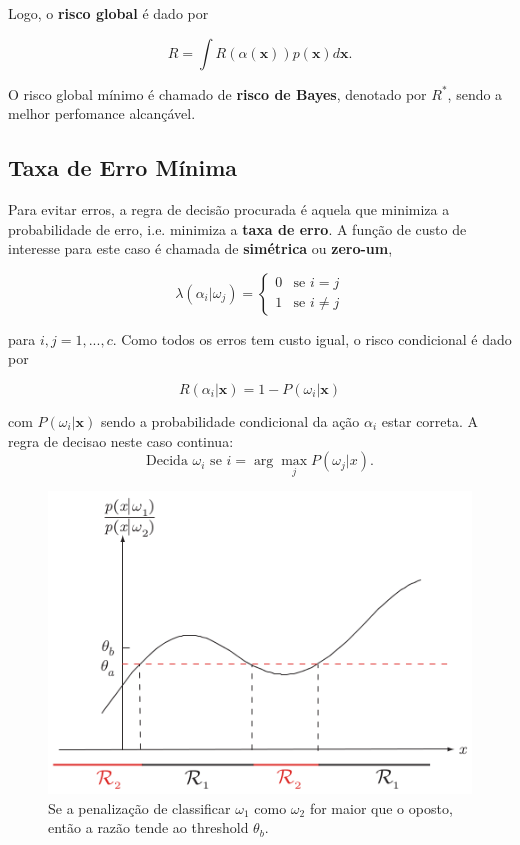 \documentclass[a4paper,12pt,twocolumn]{article}
\newcommand{\twopartdef}[4]
{
    \left\{
        \begin{array}{ll}
            #1 & \mbox{se } #2 \\
            #3 & \mbox{se } #4
        \end{array}
    \right.
}
\begin{document}
\noindent Logo, o \textbf{risco global} é dado por

\begin{equation}
    R = \int R(\alpha(\boldsymbol{x}))p(\boldsymbol{x})d\boldsymbol{x}.
    \label{eq:conditional_risk}
\end{equation}

O risco global mínimo é chamado de \textbf{risco de Bayes}, denotado por $R^*$, sendo a melhor perfomance alcançável.

\subsection{Taxa de Erro Mínima}

Para evitar erros, a regra de decisão procurada é aquela que minimiza a probabilidade de erro, i.e. minimiza a \textbf{taxa de erro}. A função de custo de interesse para este caso é chamada de \textbf{simétrica} ou \textbf{zero-um},

\begin{equation}
    \lambda(\alpha_i|\omega_j) = \twopartdef{0}{i=j}{1}{i \neq j}
    \label{eq:loss_zero_one}
\end{equation}

\noindent para $i, j = 1, ..., c$. Como todos os erros tem custo igual, o risco condicional é dado por

\begin{equation}
    R(\alpha_i|\boldsymbol{x}) = 1 - P(\omega_i|\boldsymbol{x})
    \label{eq:conditional_risk_zero_one}
\end{equation}

\noindent com $P(\omega_i|\boldsymbol{x})$ sendo a probabilidade condicional da ação $\alpha_i$ estar correta. A regra de decisao neste caso continua:
\begin{equation}
    \text{Decida } \omega_i \text{ se } i = \arg\max_j P(\omega_j|x).
    \label{eq:decision_5}
\end{equation}

\begin{figure}[ht]
    \centering
    \includegraphics[width=\columnwidth]{decision_region}
    \caption{Se a penalização de classificar $\omega_1$ como $\omega_2$ for maior que o oposto, então a razão tende ao threshold $\theta_b$.}
    \label{fig:decision_region}
\end{figure}
\end{document}
